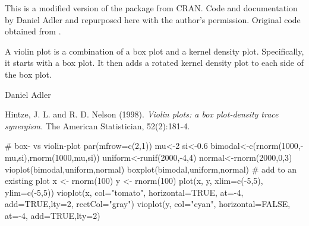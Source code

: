 \documentclass[a4paper]{book}
\begin{document}
%
\begin{Details}\relax
This is a modified version of the  package from CRAN.
Code and documentation by Daniel Adler and repurposed here with the author's permission.
Original code obtained from .

A violin plot is a combination of a box plot and a kernel density plot.
Specifically, it starts with a box plot. It then adds a rotated kernel density plot to each side of the box plot.
\end{Details}
%
\begin{Author}\relax
Daniel Adler 
\end{Author}
%
\begin{References}\relax
Hintze, J. L. and R. D. Nelson (1998).  \emph{Violin plots: a box plot-density trace synergism.}  The American Statistician, 52(2):181-4.
\end{References}
%
\begin{SeeAlso}\relax
{} 
\end{SeeAlso}
%
\begin{Examples}
\begin{ExampleCode}
# box- vs violin-plot
par(mfrow=c(2,1))
mu<-2
si<-0.6
bimodal<-c(rnorm(1000,-mu,si),rnorm(1000,mu,si))
uniform<-runif(2000,-4,4)
normal<-rnorm(2000,0,3)
vioplot(bimodal,uniform,normal)
boxplot(bimodal,uniform,normal)
# add to an existing plot
x <- rnorm(100)
y <- rnorm(100)
plot(x, y, xlim=c(-5,5), ylim=c(-5,5))
vioplot(x, col="tomato", horizontal=TRUE, at=-4, add=TRUE,lty=2, rectCol="gray")
vioplot(y, col="cyan", horizontal=FALSE, at=-4, add=TRUE,lty=2)
\end{ExampleCode}
\end{Examples}
\printindex{}
\end{document}
